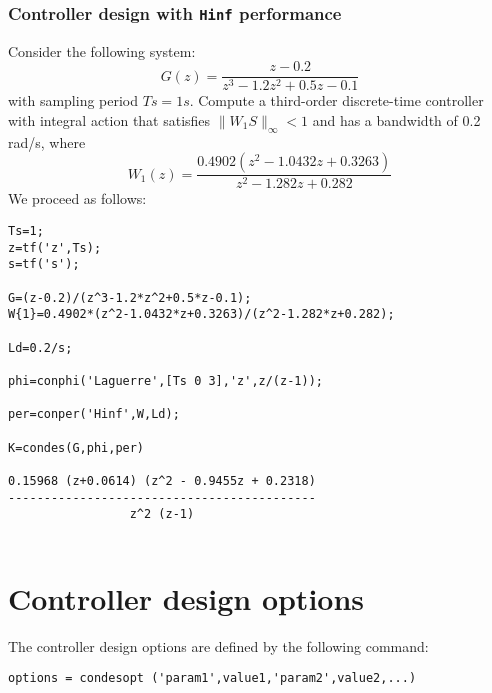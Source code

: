 \documentclass [12pt , a4paper] {report}
\begin{document}
\subsubsection{Controller design with {\tt Hinf} performance}
Consider the following system:
$$G(z)=\frac{z-0.2}{z^3-1.2z^2+0.5z-0.1}$$
with sampling period $Ts=1 s$. Compute a third-order discrete-time controller with integral action that satisfies $\| W_1 S\|_\infty < 1$ and has a bandwidth of 0.2 rad/s, where
$$W_1(z)=\frac{0.4902(z^2-1.0432z+0.3263)}{z^2-1.282z+0.282}$$
We proceed as follows:
\begin{lstlisting}
Ts=1;
z=tf('z',Ts);
s=tf('s');

G=(z-0.2)/(z^3-1.2*z^2+0.5*z-0.1);
W{1}=0.4902*(z^2-1.0432*z+0.3263)/(z^2-1.282*z+0.282);

Ld=0.2/s;

phi=conphi('Laguerre',[Ts 0 3],'z',z/(z-1));

per=conper('Hinf',W,Ld);

K=condes(G,phi,per)

0.15968 (z+0.0614) (z^2 - 0.9455z + 0.2318)
-------------------------------------------
                 z^2 (z-1)


\end{lstlisting}

\section{Controller design options}

The controller design options are defined by the following command:
\begin{lstlisting}
options = condesopt ('param1',value1,'param2',value2,...)
\end{lstlisting}
\end{document}
